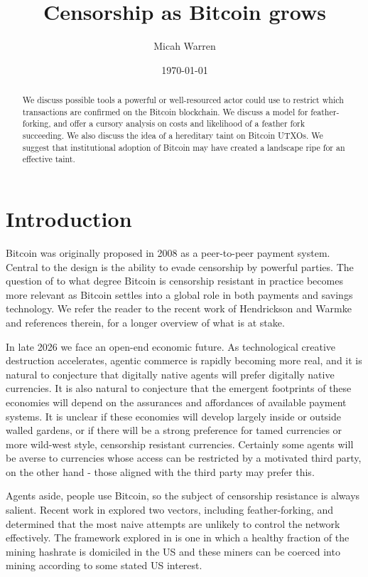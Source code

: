 \documentclass{article}%
\begin{document}
\title{Censorship as Bitcoin grows}
\author{Micah Warren}
\date{\today}
\maketitle

\begin{abstract}
We discuss possible tools a powerful or well-resourced actor could use to restrict which transactions are confirmed on the Bitcoin blockchain.  We discuss a model for feather-forking, and offer a cursory analysis on costs and likelihood of a feather fork succeeding.  We also discuss the idea of a hereditary taint on Bitcoin UTXOs.  We suggest that institutional adoption of Bitcoin may have created a landscape ripe for an effective taint.

\end{abstract}

\section{Introduction}

Bitcoin was originally proposed in 2008 as a peer-to-peer payment system.
Central to the design is the ability to evade censorship by
powerful parties.  The question of to what degree
Bitcoin is censorship resistant in practice becomes more relevant as Bitcoin settles into a
global role in both payments and savings technology.  We refer the reader to
the recent work of Hendrickson and Warmke \cite{HW} and references therein, for a longer overview of what is at stake.

In late 2026 we face an open-end economic
future.  As technological creative destruction accelerates, agentic commerce is rapidly
becoming more real, and it is natural to conjecture that digitally
native agents will prefer digitally native currencies. It is also natural to conjecture that the emergent footprints of these economies will depend on the assurances and affordances of available payment systems.  It is unclear if these economies will develop largely inside or outside walled
gardens, or if there will be a strong preference for tamed currencies or more wild-west style, censorship resistant currencies.
Certainly some agents will be averse to currencies whose access can be
restricted by a motivated third party, on the other hand - those aligned with the third party may prefer this.

Agents aside, people use Bitcoin, so the subject of censorship resistance is
always salient.  Recent work in 
\cite{HW} explored two vectors, including feather-forking, and determined
that the most naive attempts are unlikely to control the network effectively.
 The framework explored in \cite{HW} is one in which a healthy fraction of
the mining hashrate is domiciled in the US and these miners can be coerced
into mining according to some stated US interest.
\end{document}
